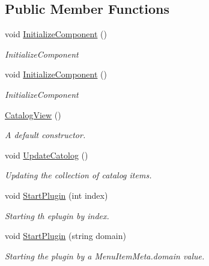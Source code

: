 \subsection*{Public Member Functions}
\begin{DoxyCompactItemize}
\item 
void \mbox{\hyperlink{class_wpf_handler_1_1_u_i_1_1_controls_1_1_catalog_view_a90654c67633bf7c8848f2b8dc1a3c712}{Initialize\+Component}} ()
\begin{DoxyCompactList}\small\item\em Initialize\+Component \end{DoxyCompactList}\item 
void \mbox{\hyperlink{class_wpf_handler_1_1_u_i_1_1_controls_1_1_catalog_view_a90654c67633bf7c8848f2b8dc1a3c712}{Initialize\+Component}} ()
\begin{DoxyCompactList}\small\item\em Initialize\+Component \end{DoxyCompactList}\item 
\mbox{\hyperlink{class_wpf_handler_1_1_u_i_1_1_controls_1_1_catalog_view_a805f93d9e815024d12b2ca2be31ad071}{Catalog\+View}} ()
\begin{DoxyCompactList}\small\item\em A default constructor. \end{DoxyCompactList}\item 
void \mbox{\hyperlink{class_wpf_handler_1_1_u_i_1_1_controls_1_1_catalog_view_aad6922f8af811dedadc8b4b7ea95ef18}{Update\+Catolog}} ()
\begin{DoxyCompactList}\small\item\em Updating the collection of catalog items. \end{DoxyCompactList}\item 
void \mbox{\hyperlink{class_wpf_handler_1_1_u_i_1_1_controls_1_1_catalog_view_a951cea1f55959f899562479d7b2e4490}{Start\+Plugin}} (int index)
\begin{DoxyCompactList}\small\item\em Starting th eplugin by index. \end{DoxyCompactList}\item 
void \mbox{\hyperlink{class_wpf_handler_1_1_u_i_1_1_controls_1_1_catalog_view_ac22dfdce2ff1a076449c33adf17f1dc1}{Start\+Plugin}} (string domain)
\begin{DoxyCompactList}\small\item\em Starting the plugin by a Menu\+Item\+Meta.\+domain value. \end{DoxyCompactList}\end{DoxyCompactItemize}
